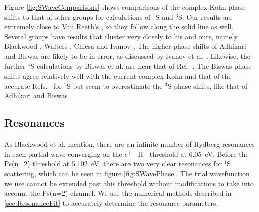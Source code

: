\documentclass[Dissertation.tex]{subfiles}
\begin{document}
Figure \ref{fig:SWaveComparisons} shows comparisons of the complex Kohn phase shifts to that of other groups for calculations of $^1$S and $^3$S. Our results are extremely close to Van Reeth's \cite{VanReeth2003}, so they follow along the solid line as well. Several groups have results that cluster very closely to his and ours, namely Blackwood \cite{Blackwood2002}, Walters \cite{Walters2004}, Chiesa \cite{Chiesa2002} and Ivanov \cite{Ivanov2002}. The higher phase shifts of Adhikari and Biswas \cite{Adhikari1999} are likely to be in error, as discussed by Ivanov et al. \cite{Ivanov2002}. Likewise, the further $^1$S calculations by Biswas et al. \cite{Biswas2002a} are near that of Ref.~\cite{Adhikari1999}. The Biswas \cite{Biswas2001} phase shifts agree relatively well with the current complex Kohn and that of the accurate Refs.~\cite{Blackwood2002,VanReeth2003,Walters2004} for $^1$S but seem to overestimate the $^3$S phase shifts, like that of Adhikari and Biswas \cite{Adhikari1999}.



\subsection{Resonances}
\label{sec:SWaveResonances}

As Blackwood et al. \cite{Blackwood2002} mention, there are an infinite number of Rydberg resonances in each partial wave converging on the $e^+$+H$^-$ threshold at \SI{6.05}{eV}. Before the Ps(n=2) threshold at \SI{5.102}{eV}, there are two very clear resonances for $^1$S scattering, which can be seen in figure \ref{fig:SWavePhase}. The trial wavefunction we use cannot be extended past this threshold without modifications to take into account the Ps(n=2) channel. We use the numerical methods described in \cref{sec:ResonanceFit} to accurately determine the resonance parameters.
\end{document}
